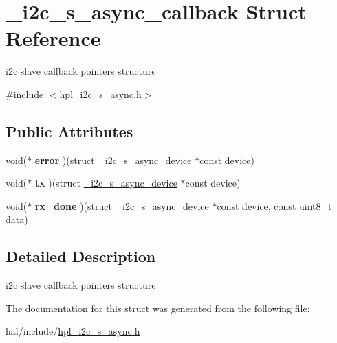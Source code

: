 \hypertarget{struct__i2c__s__async__callback}{}\section{\+\_\+i2c\+\_\+s\+\_\+async\+\_\+callback Struct Reference}
\label{struct__i2c__s__async__callback}


i2c slave callback pointers structure  




{\ttfamily \#include $<$hpl\+\_\+i2c\+\_\+s\+\_\+async.\+h$>$}

\subsection*{Public Attributes}
\begin{DoxyCompactItemize}
\item 
\mbox{\label{struct__i2c__s__async__callback_a8f77685788b1b61e56d73997111526f3}} 
void($\ast$ {\bfseries error} )(struct \hyperlink{struct__i2c__s__async__device}{\+\_\+i2c\+\_\+s\+\_\+async\+\_\+device} $\ast$const device)
\item 
\mbox{\label{struct__i2c__s__async__callback_a6d1203679eb73e9ccae09323f03928d3}} 
void($\ast$ {\bfseries tx} )(struct \hyperlink{struct__i2c__s__async__device}{\+\_\+i2c\+\_\+s\+\_\+async\+\_\+device} $\ast$const device)
\item 
\mbox{\label{struct__i2c__s__async__callback_ade36d026a378647646e897898bbed913}} 
void($\ast$ {\bfseries rx\+\_\+done} )(struct \hyperlink{struct__i2c__s__async__device}{\+\_\+i2c\+\_\+s\+\_\+async\+\_\+device} $\ast$const device, const uint8\+\_\+t data)
\end{DoxyCompactItemize}


\subsection{Detailed Description}
i2c slave callback pointers structure 

The documentation for this struct was generated from the following file\+:\begin{DoxyCompactItemize}
\item 
hal/include/\hyperlink{hpl__i2c__s__async_8h}{hpl\+\_\+i2c\+\_\+s\+\_\+async.\+h}\end{DoxyCompactItemize}
